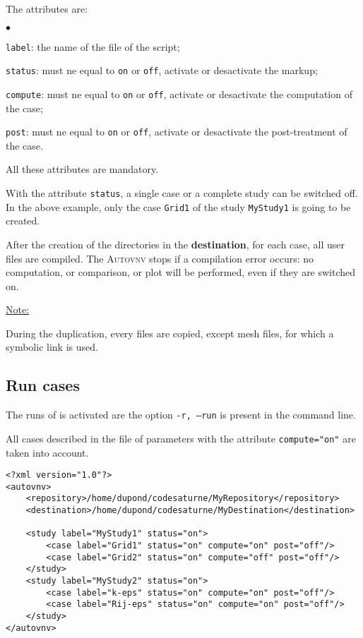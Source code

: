 \documentclass[a4paper,10pt,twoside]{article}
\begin{document}
The attributes are:
\begin{list}{$\bullet$}{}
\item \texttt{label}: the name of the file of the script;
\item \texttt{status}: must ne equal to \texttt{on} or \texttt{off},
activate or desactivate the markup;
\item \texttt{compute}: must ne equal to \texttt{on} or \texttt{off},
activate or desactivate the computation of the case;
\item \texttt{post}: must ne equal to \texttt{on} or \texttt{off},
activate or desactivate the post-treatment of the case.
\end{list}

All these attributes are mandatory.

With the attribute \texttt{status}, a single case or a complete study can be switched off.
In the above example, only the case \texttt{Grid1} of the study \texttt{MyStudy1} is going
to be created.

After the creation of the directories in the \textbf{destination}, for each case, all user files
are compiled. The \textsc{Autovnv} stops if a compilation error occurs: no computation, or
comparison, or plot will be performed, even if they are switched on.

\underline{Note:}

During the duplication, every files are copied, except mesh files, for which a symbolic link is used.


\subsection{Run cases}

The runs of \CS is activated are the option \texttt{-r, --run} is present in the command line.

All cases described in the file of parameters with the attribute \texttt{compute="on"}
are taken into account.

\begin{verbatim}
<?xml version="1.0"?>
<autovnv>
    <repository>/home/dupond/codesaturne/MyRepository</repository>
    <destination>/home/dupond/codesaturne/MyDestination</destination>

    <study label="MyStudy1" status="on">
        <case label="Grid1" status="on" compute="on" post="off"/>
        <case label="Grid2" status="on" compute="off" post="off"/>
    </study>
    <study label="MyStudy2" status="on">
        <case label="k-eps" status="on" compute="on" post="off"/>
        <case label="Rij-eps" status="on" compute="on" post="off"/>
    </study>
</autovnv>
\end{verbatim}
\end{document}
